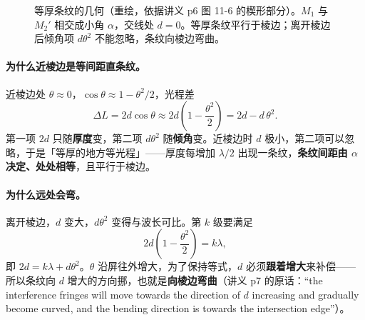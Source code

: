\documentclass[11pt]{ctexart}
\begin{document}
\begin{figure}[H]
\centering
{}
\caption{等厚条纹的几何（重绘，依据讲义 p6 图 11-6 的楔形部分）。\(M_1\) 与 \(M_2'\) 相交成小角 \(\alpha\)，交线处 \(d=0\)。等厚条纹平行于棱边；离开棱边后倾角项 \(d\theta^2\) 不能忽略，条纹向棱边弯曲。}
\end{figure}

\paragraph{为什么近棱边是等间距直条纹。}近棱边处 \(\theta\approx0\)，\(\cos\theta\approx1-\theta^2/2\)，光程差
\[
\Delta L=2d\cos\theta\approx2d\left(1-\frac{\theta^2}{2}\right)=2d-d\,\theta^2 .
\]
第一项 \(2d\) 只随\textbf{厚度}变，第二项 \(d\theta^2\) 随\textbf{倾角}变。近棱边时 \(d\) 极小，第二项可以忽略，于是「等厚的地方等光程」——厚度每增加 \(\lambda/2\) 出现一条纹，\textbf{条纹间距由 \(\alpha\) 决定、处处相等}，且平行于棱边。

\paragraph{为什么远处会弯。}离开棱边，\(d\) 变大，\(d\theta^2\) 变得与波长可比。第 \(k\) 级要满足
\[
2d\left(1-\frac{\theta^2}{2}\right)=k\lambda ,
\]
即 \(2d=k\lambda+d\theta^2\)。\(\theta\) 沿屏往外增大，为了保持等式，\(d\) 必须\textbf{跟着增大}来补偿——所以条纹向 \(d\) 增大的方向挪，也就是\textbf{向棱边弯曲}（讲义 p7 的原话：``the interference fringes will move towards the direction of \(d\) increasing and gradually become curved, and the bending direction is towards the intersection edge''）。
\end{document}
